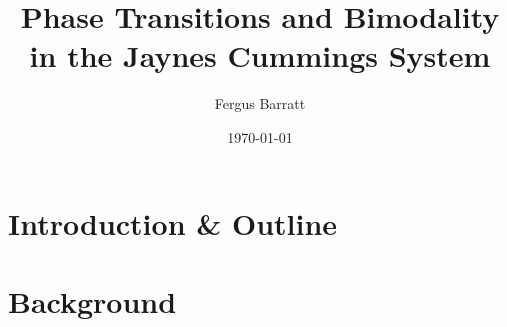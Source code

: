 \documentclass[reqno]{amsart}
\title{Phase Transitions and Bimodality in the Jaynes Cummings System}
\author{Fergus Barratt}
\date{\today}
\begin{document}
\maketitle
\part{Introduction \& Outline}

\part{Background}






\printbibliography\
\end{document}
